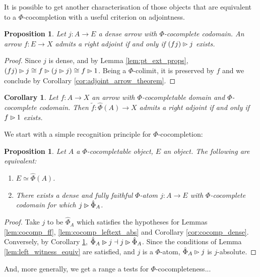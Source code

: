 \documentclass[10pt,a4paper]{article}
\newcommand{\coce}[2]{{\hat{#1}}_{#2}}
\newcommand{\coc}[2]{{\widehat{#1}}(#2)}
\newcommand{\plext}{\mathbin{{\rhd}\mathclap{\mspace{-17.5mu}\cdot}}}
\newcommand{\simeqq}{\cong}
\theoremstyle{plain}
\newtheorem{proposition}[theorem]{Proposition}
\newtheorem{corollary}[theorem]{Corollary}
\theoremstyle{definition}
\theoremstyle{remark}
\begin{document}
It is possible to get another characterisation of those objects that are equivalent to a $\Phi$-cocompletion with a useful criterion on adjointness.

\begin{proposition}
    Let $j : A \to E$ a dense arrow with $\Phi$-cocomplete codomain. An arrow $f : E \to X$ admits a right adjoint if and only if $(fj)\plext j$ exists.
\end{proposition}

\begin{proof}
    Since $j$ is dense, and by Lemma \ref{lem:pt_ext_props}, $(fj)\plext j \simeqq f \plext (j \plext j) \simeqq f \plext 1$. Being a $\Phi$-colimit, it is preserved by $f$ and we conclude by Corollary \ref{cor:adjoint_arrow_theorem}.
\end{proof}

\begin{corollary}
    \label{cor:cocomp_adj_iff_lext}
    Let $f : A \to X$ an arrow with $\Phi$-cocompletable domain and $\Phi$-cocomplete codomain. Then $\widetilde f : \coc\Phi A \to X$ admits a right adjoint if and only if $f\plext 1$ exists.
\end{corollary}

We start with a simple recognition principle for $\Phi$-cocompletion:

\begin{proposition}
    Let $A$ a $\Phi$-cocompletable object, $E$ an object. The following are equivalent:
    \begin{enumerate}
        \item $E\simeq\coc\Phi A$.
        \item There exists a dense and fully faithful $\Phi$-atom $j : A \to E$ with $\Phi$-cocomplete codomain for which $j \plext \coce\Phi A$.
    \end{enumerate}
\end{proposition}

\begin{proof}
    Take $j$ to be $\coce\Phi A$ which satisfies the hypotheses for Lemmas \ref{lem:cocomp_ff}, \ref{lem:cocomp_leftext_abs} and Corollary \ref{cor:cocomp_dense}. Conversely, by Corollary \ref{cor:cocomp_adj_iff_lext}, $\coce\Phi A\plext j\dashv j\plext\coce\Phi A$. Since the conditions of Lemma \ref{lem:left_witness_equiv} are satisfied, and $j$ is a $\Phi$-atom, $\coce\Phi A\plext j$ is $j$-absolute.
\end{proof}

And, more generally, we get a range a tests for $\Phi$-cocompleteness...
\end{document}
